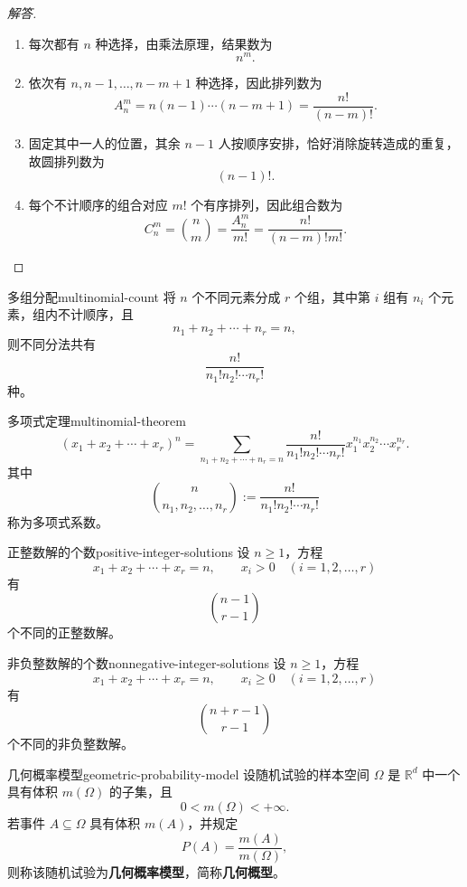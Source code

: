 \begin{proof}[解答]
\begin{enumerate}
\item 每次都有 $n$ 种选择，由乘法原理，结果数为
\[n^m.\]
\item 依次有 $n,n-1,\ldots,n-m+1$ 种选择，因此排列数为
\[A_n^m=n(n-1)\cdots(n-m+1)=\frac{n!}{(n-m)!}.\]
\item 固定其中一人的位置，其余 $n-1$ 人按顺序安排，恰好消除旋转造成的重复，故圆排列数为
\[(n-1)!.\]
\item 每个不计顺序的组合对应 $m!$ 个有序排列，因此组合数为
\[C_n^m=\binom nm=\frac{A_n^m}{m!}=\frac{n!}{(n-m)!m!}.\]
\end{enumerate}
\end{proof}

\begin{proposition}{多组分配}{multinomial-count}
将 $n$ 个不同元素分成 $r$ 个组，其中第 $i$ 组有 $n_i$ 个元素，组内不计顺序，且
\[
n_1+n_2+\cdots+n_r=n,
\]
则不同分法共有
\[
\dfrac{n!}{n_1!n_2!\cdots n_r!}
\]
种。
\end{proposition}

\begin{mycorollary}{多项式定理}{multinomial-theorem}
\[
(x_1+x_2+\cdots+x_r)^n
=\sum_{n_1+n_2+\cdots+n_r=n}
\dfrac{n!}{n_1!n_2!\cdots n_r!}
x_1^{n_1}x_2^{n_2}\cdots x_r^{n_r}.
\]
其中
\[
\binom{n}{n_1,n_2,\ldots,n_r}
:=\dfrac{n!}{n_1!n_2!\cdots n_r!}
\]
称为多项式系数。
\end{mycorollary}

\begin{proposition}{正整数解的个数}{positive-integer-solutions}
设 $n\geq1$，方程
\[
x_1+x_2+\cdots+x_r=n,\qquad x_i>0\quad(i=1,2,\ldots,r)
\]
有
\[
\binom{n-1}{r-1}
\]
个不同的正整数解。
\end{proposition}

\begin{proposition}{非负整数解的个数}{nonnegative-integer-solutions}
设 $n\geq1$，方程
\[
x_1+x_2+\cdots+x_r=n,\qquad x_i\geq0\quad(i=1,2,\ldots,r)
\]
有
\[
\binom{n+r-1}{r-1}
\]
个不同的非负整数解。
\end{proposition}

\begin{mydefinition}{几何概率模型}{geometric-probability-model}
设随机试验的样本空间 $\Omega$ 是 $\mathbb{R}^d$ 中一个具有体积 $m(\Omega)$ 的子集，且
\[
0<m(\Omega)<+\infty.
\]
若事件 $A\subseteq\Omega$ 具有体积 $m(A)$，并规定
\[
P(A)=\dfrac{m(A)}{m(\Omega)},
\]
则称该随机试验为\textbf{几何概率模型}，简称\textbf{几何概型}。
\end{mydefinition}

